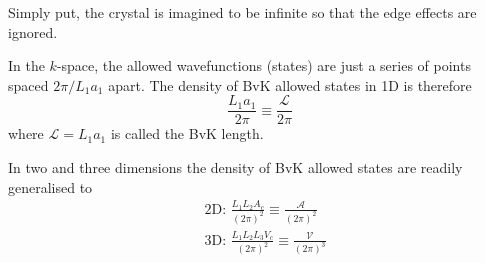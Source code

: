 Simply put, the crystal is imagined to be infinite so that the edge effects are ignored. \par
In the $k$-space, the allowed wavefunctions (states) are just a series of points spaced $2\pi/L_1a_1$ apart. The density of BvK allowed states in 1D is therefore
\begin{equation}
	\frac{L_1a_1}{2\pi}\equiv\frac{\mathcal{L}}{2\pi}
\end{equation}
where $\mathcal{L}=L_1a_1$ is called the BvK length.\par
In two and three dimensions the density of BvK allowed states are readily generalised to
\begin{equation}
\begin{aligned}
&\text{2D: }\frac{L_1L_2A_c}{(2\pi)^2}\equiv\frac{\mathcal{A}}{(2\pi)^2}\\
&\text{3D: }\frac{L_1L_2L_3V_c}{(2\pi)^2}\equiv\frac{\mathcal{V}}{(2\pi)^3}
\end{aligned}
\end{equation}
